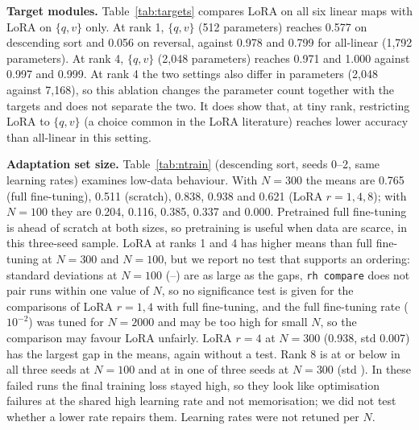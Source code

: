 \textbf{Target modules.} Table~\ref{tab:targets} compares LoRA on all six linear maps with LoRA on $\{q,v\}$ only. At rank 1, $\{q,v\}$ (512 parameters) reaches 0.577 on descending sort and 0.056 on reversal, against 0.978 and 0.799 for all-linear (1,792 parameters). At rank 4, $\{q,v\}$ (2,048 parameters) reaches 0.971 and 1.000 against 0.997 and 0.999. At rank 4 the two settings also differ in parameters (2,048 against 7,168), so this ablation changes the parameter count together with the targets and does not separate the two. It does show that, at tiny rank, restricting LoRA to $\{q,v\}$ (a choice common in the LoRA literature) reaches lower accuracy than all-linear in this setting.

\begin{table}[t]\centering\caption{LoRA target modules (5 seeds), mean $\pm$ std exact match.}\label{tab:targets}\resizebox{\columnwidth}{!}{}\end{table}

\textbf{Adaptation set size.} Table~\ref{tab:ntrain} (descending sort, seeds 0--2, same learning rates) examines low-data behaviour. With $N=300$ the means are 0.765 (full fine-tuning), 0.511 (scratch), 0.838, 0.938 and 0.621 (LoRA $r=1,4,8$); with $N=100$ they are 0.204, 0.116, 0.385, 0.337 and 0.000. Pretrained full fine-tuning is ahead of scratch at both sizes, so pretraining is useful when data are scarce, in this three-seed sample. LoRA at ranks 1 and 4 has higher means than full fine-tuning at $N=300$ and $N=100$, but we report no test that supports an ordering: standard deviations at $N=100$ (--) are as large as the gaps, \texttt{rh compare} does not pair runs within one value of $N$, so no significance test is given for the comparisons of LoRA $r=1,4$ with full fine-tuning, and the full fine-tuning rate ($10^{-2}$) was tuned for $N=2000$ and may be too high for small $N$, so the comparison may favour LoRA unfairly. LoRA $r=4$ at $N=300$ (0.938, std 0.007) has the largest gap in the means, again without a test. Rank 8 is at or below  in all three seeds at $N=100$ and at  in one of three seeds at $N=300$ (std ). In these failed runs the final training loss stayed high, so they look like optimisation failures at the shared high learning rate and not memorisation; we did not test whether a lower rate repairs them. Learning rates were not retuned per $N$.

